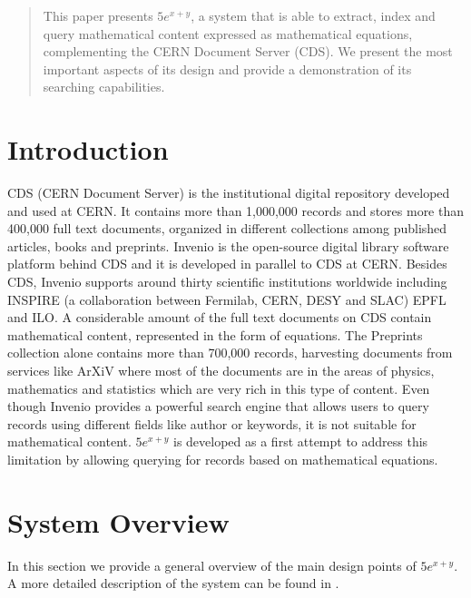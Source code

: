 \documentclass{sig-alternate}
\begin{document}
\maketitle
\begin{abstract}
This paper presents $5e^{x+y}$, a system that is able to extract, index and query mathematical content expressed as mathematical equations, complementing the CERN Document Server (CDS). We present the most important aspects of its design and provide a demonstration of its searching capabilities.

\end{abstract}




\section{Introduction}
CDS\cite{CDS1} (CERN Document Server) is the institutional digital repository developed and used at CERN\cite{CERN}. It contains more than 1,000,000 records and stores more than 400,000 full text documents, organized in different collections among published articles, books and preprints. Invenio\cite{invenio} is the open-source digital library software platform behind CDS and it is developed in parallel to CDS at CERN. Besides CDS, Invenio supports around thirty scientific institutions worldwide including INSPIRE (a collaboration between Fermilab, CERN, DESY and SLAC) EPFL and ILO. 
A considerable amount of the full text documents on CDS contain mathematical content, represented in the form of equations. The Preprints collection alone contains more than 700,000 records, harvesting documents from services like ArXiV\cite{arxiv} where most of the documents are in the areas of physics, mathematics and statistics which are very rich in this type of content. Even though Invenio provides a powerful search engine that allows users to query records using different fields like author or keywords, it is not suitable for mathematical content. $5e^{x+y}$ is developed as a first attempt to address this limitation by allowing querying for records based on mathematical equations.

\section{System Overview}
In this section we provide a general overview of the main design points of $5e^{x+y}$. A more detailed description of the system can be found in \cite{mathexplorerweb}.
\end{document}
